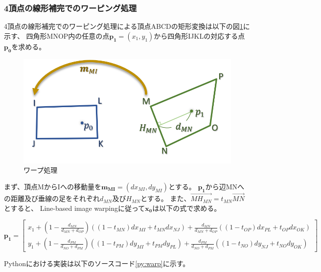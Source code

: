 \subsubsection{4頂点の線形補完でのワーピング処理}\label{sec:four_warp}
4頂点の線形補完でのワーピング処理による頂点ABCDの矩形変換は以下の図\ref{fig:warp}に示す、
四角形MNOP内の任意の点$\bm{p_1}=(x_1, y_1)$から四角形IJKLの対応する点$\bm{p_0}$を求める。

\begin{figure}[h]
    \centering
    \includegraphics[width=1\linewidth]{fig/warp.png}
    \caption{ワープ処理}
    \label{fig:warp}
\end{figure}


まず、頂点MからIへの移動量を$\bm{m_{MI}} = (dx_{MI}, dy_{MI})$とする。
$\bm{p_1}$から辺MNへの距離及び垂線の足をそれぞれ$d_{MN}$及び$H_{MN}$とする。
また、$\overrightarrow{MH_{MN}}=t_{MN}\overrightarrow{MN}$とすると、
Line-based image warping\cite{}に従って$\bm{x_0}$は以下の式で求める。

\begin{equation}\label{eq:warp}
    \bm{p_1} =  \begin{bmatrix} 
                    x_1 + \left( 1 - \frac{d_{MN}}{d_{MN}+d_{OP}} \right) \left( \left( 1 - t_{MN} \right) dx_{MI} + t_{MN} dx_{NJ} \right) + \frac{d_{MN}}{d_{MN}+d_{OP}} \left( \left( 1 - t_{OP} \right) dx_{PL} + t_{OP} dx_{OK} \right) \\
                    y_1 + \left( 1 - \frac{d_{PM}}{d_{NO}+d_{PM}} \right) \left( \left( 1 - t_{PM} \right) dy_{MI} + t_{PM} dy_{PL} \right) + \frac{d_{PM}}{d_{NO}+d_{PM}} \left( \left( 1 - t_{NO} \right) dy_{NJ} + t_{NO} dy_{OK} \right)
                \end{bmatrix}
\end{equation}

Pythonにおける実装は以下のソースコード\ref{py:warp}に示す。

